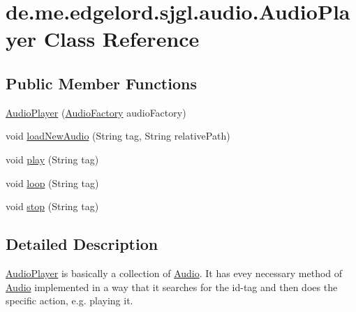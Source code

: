 \hypertarget{classde_1_1me_1_1edgelord_1_1sjgl_1_1audio_1_1_audio_player}{}\section{de.\+me.\+edgelord.\+sjgl.\+audio.\+Audio\+Player Class Reference}
\label{classde_1_1me_1_1edgelord_1_1sjgl_1_1audio_1_1_audio_player}
\subsection*{Public Member Functions}
\begin{DoxyCompactItemize}
\item 
\mbox{\hyperlink{classde_1_1me_1_1edgelord_1_1sjgl_1_1audio_1_1_audio_player_aa2ce9d41080a96a25e09f9b0830e7b04}{Audio\+Player}} (\mbox{\hyperlink{classde_1_1me_1_1edgelord_1_1sjgl_1_1factory_1_1_audio_factory}{Audio\+Factory}} audio\+Factory)
\item 
void \mbox{\hyperlink{classde_1_1me_1_1edgelord_1_1sjgl_1_1audio_1_1_audio_player_a3fa42a34769a40aaf94c16e1589f7b09}{load\+New\+Audio}} (String tag, String relative\+Path)
\item 
void \mbox{\hyperlink{classde_1_1me_1_1edgelord_1_1sjgl_1_1audio_1_1_audio_player_aecce0a524758259586949e7fb0c477d6}{play}} (String tag)
\item 
void \mbox{\hyperlink{classde_1_1me_1_1edgelord_1_1sjgl_1_1audio_1_1_audio_player_a4773c3bc2054fcb5f7892ebf330c68b8}{loop}} (String tag)
\item 
void \mbox{\hyperlink{classde_1_1me_1_1edgelord_1_1sjgl_1_1audio_1_1_audio_player_a52bd650d815c823dc0a5e99b4aeba927}{stop}} (String tag)
\end{DoxyCompactItemize}


\subsection{Detailed Description}
{\ttfamily \mbox{\hyperlink{classde_1_1me_1_1edgelord_1_1sjgl_1_1audio_1_1_audio_player}{Audio\+Player}}} is basically a collection of {\ttfamily \mbox{\hyperlink{classde_1_1me_1_1edgelord_1_1sjgl_1_1audio_1_1_audio}{Audio}}}. It has evey necessary method of {\ttfamily \mbox{\hyperlink{classde_1_1me_1_1edgelord_1_1sjgl_1_1audio_1_1_audio}{Audio}}} implemented in a way that it searches for the id-\/tag and then does the specific action, e.\+g. playing it.

